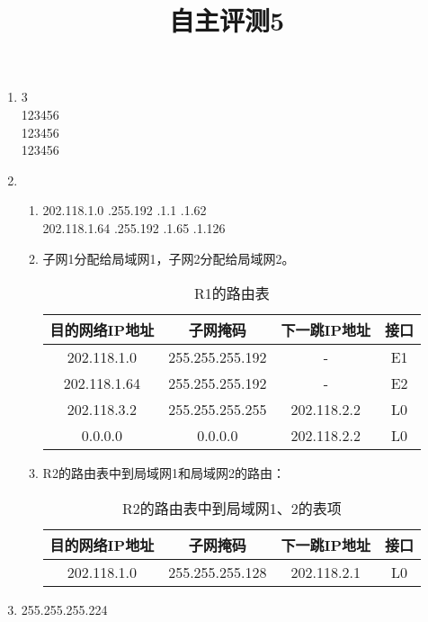 \documentclass[11pt]{article}
\title{自主评测5}
\date{}
\author{}
\begin{document}
\maketitle

\begin{enumerate}
    \renewcommand{\labelenumii}{(\arabic{enumii})}
    \item 3 \quad \\ 123456     \\
                     123456     \\
                     123456    
    \item
    \begin{enumerate}
        \item 202.118.1.0 .255.192  .1.1 .1.62 \\
              202.118.1.64 .255.192  .1.65 .1.126
        \item 子网1分配给局域网1，子网2分配给局域网2。
        \begin{table}[htbp]
            \centering
            \begin{tabular}{|c|c|c|c|} 
            \hline
            目的网络IP地址 & 子网掩码 & 下一跳IP地址 & 接口 \\ 
            \hline
            202.118.1.0 & 255.255.255.192 & - & E1 \\ 
            \hline
            202.118.1.64 & 255.255.255.192 & - & E2 \\ 
            \hline
            202.118.3.2 & 255.255.255.255 & 202.118.2.2 & L0 \\ 
            \hline
            0.0.0.0 & 0.0.0.0 & 202.118.2.2 & L0 \\
            \hline
            \end{tabular}
            \label{table-1}
            \caption{R1的路由表}
        \end{table}
        \item R2的路由表中到局域网1和局域网2的路由：
        \begin{table}[htbp]
            \centering
            \begin{tabular}{|c|c|c|c|} 
            \hline
            目的网络IP地址 & 子网掩码 & 下一跳IP地址 & 接口 \\ 
            \hline
            202.118.1.0 & 255.255.255.128 & 202.118.2.1 & L0 \\ 
            \hline
            \end{tabular}
            \label{table-2}
            \caption{R2的路由表中到局域网1、2的表项}
        \end{table}
    \end{enumerate}
    \item 255.255.255.224 
\end{enumerate}
\end{document}
